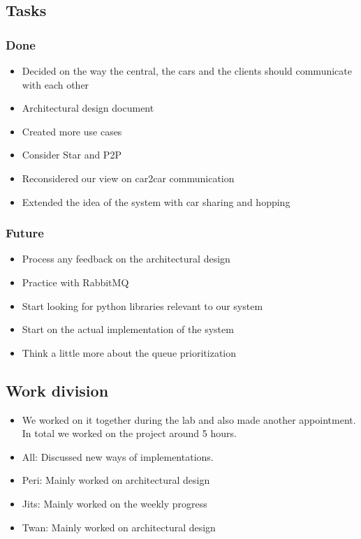 \documentclass[a4paper]{article}
\begin{document}
\subsection*{Tasks}
\subsubsection*{Done}
\begin{itemize}
    \item Decided on the way the central, the cars and the clients should communicate with each other
    \item Architectural design document
    \item Created more use cases
    \item Consider Star and P2P
    \item Reconsidered our view on car2car communication
    \item Extended the idea of the system with car sharing and hopping
\end{itemize}

\subsubsection*{Future}
\begin{itemize}
    \item Process any feedback on the architectural design
    \item Practice with RabbitMQ
	\item Start looking for python libraries relevant to our system
    \item Start on the actual implementation of the system
    \item Think a little more about the queue prioritization 
\end{itemize}

\subsection*{Work division}
\begin{itemize}
	\item We worked on it together during the lab and also made another appointment. In total we worked on the project around 5 hours. 
	\item All: Discussed new ways of implementations. 
    \item Peri: Mainly worked on architectural design
    \item Jits: Mainly worked on the weekly progress
    \item Twan: Mainly worked on architectural design
\end{itemize}
\end{document}
